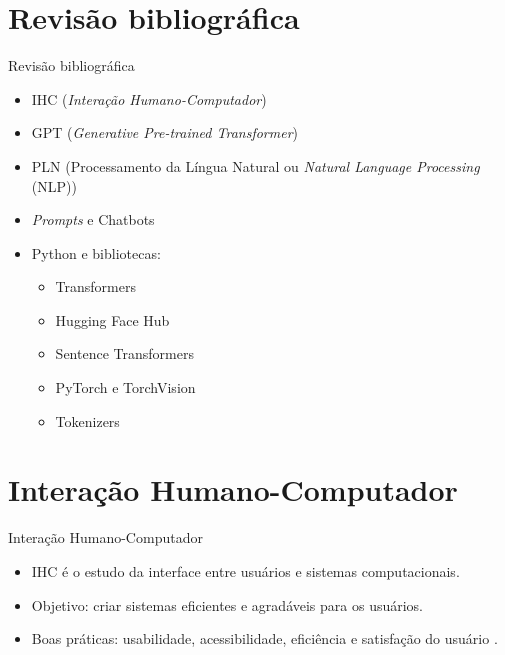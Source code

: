 \documentclass{beamer}
\begin{document}
\section{Revisão bibliográfica}
\begin{frame}[allowframebreaks]{Revisão bibliográfica}
  \begin{itemize}
    \item IHC (\textit{Interação Humano-Computador})
    \item GPT (\textit{Generative Pre-trained Transformer})
    \item PLN (Processamento da Língua Natural ou \textit{Natural Language Processing} (NLP))
    \item \textit{Prompts} e Chatbots
    \item Python e bibliotecas:
      \begin{itemize}
        \item Transformers
        \item Hugging Face Hub
        \item Sentence Transformers
        \item PyTorch e TorchVision
        \item Tokenizers
      \end{itemize}
  \end{itemize}
\end{frame}

\section{Interação Humano-Computador}

\begin{frame}{Interação Humano-Computador}
    \begin{itemize}
        \item IHC é o estudo da interface entre usuários e sistemas computacionais.
        \item Objetivo: criar sistemas eficientes e agradáveis para os usuários.
        \item Boas práticas: usabilidade, acessibilidade, eficiência e satisfação do usuário \cite{Norman13}.
    \end{itemize}
\end{frame}
\end{document}
